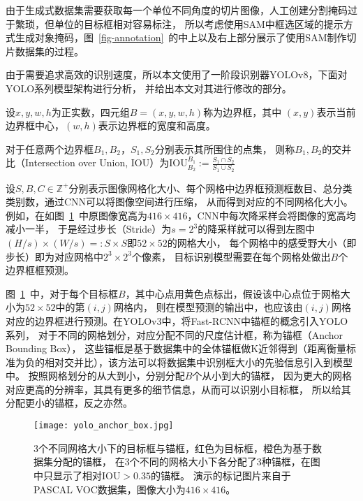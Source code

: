 由于生成式数据集需要获取每一个单位不同角度的切片图像，人工创建分割掩码过于繁琐，但单位的目标框相对容易标注，
所以考虑使用SAM中框选区域的提示方式生成对象掩码，图~\ref{fig-annotation}~的中上以及右上部分展示了使用SAM制作切片数据集的过程。

由于需要追求高效的识别速度，所以本文使用了一阶段识别器YOLOv8，下面对YOLO系列模型架构进行分析，
并给出本文对其进行修改的部分。

设$x,y,w,h$为正实数，四元组$B=(x,y,w,h)$称为边界框，其中
$(x,y)$表示当前边界框中心，$(w,h)$表示边界框的宽度和高度。

对于任意两个边界框$B_1,B_2$，$S_1,S_2$分别表示其所围住的点集，
则称$B_1,B_2$的交并比（Intersection over Union, IOU）为$\text{IOU}_{B_2}^{B_1}:=\frac{S_1\cap S_2}{S_1\cup S_2}$

设$S,B,C\in\mathbb{Z}^+$分别表示图像网格化大小、每个网格中边界框预测框数目、总分类类别数，通过CNN可以将图像空间进行压缩，
从而得到对应的不同网格化大小。例如，在如图~\ref{fig-anchor}~中原图像宽高为$416\times 416$，CNN中每次降采样会将图像的宽高均减小一半，
于是经过步长（Stride）为$s=2^3$的降采样就可以得到左图中$(H/s)\times (W/s) =: S\times S$即$52\times 52$的网格大小，
每个网格中的感受野大小（即步长）即为对应网格中$2^3\times 2^3$个像素，
目标识别模型需要在每个网格处做出$B$个边界框框预测。

图~\ref{fig-anchor}~中，对于每个目标框$B$，其中心点用黄色点标出，假设该中心点位于网格大小为$52\times 52$中的第$(i,j)$网格内，
则在模型预测的输出中，也应该由$(i,j)$网格对应的边界框进行预测。在YOLOv3中，将Fast-RCNN中锚框的概念引入YOLO系列，
对于不同的网格划分，对应分配不同的尺度估计框，称为锚框（Anchor Bounding Box），
这些锚框是基于数据集中的全体锚框做K近邻得到（距离衡量标准为负的相对交并比），该方法可以将数据集中识别框大小的先验信息引入到模型中。
按照网格划分的从大到小，分别分配$B$个从小到大的锚框，
因为更大的网格对应更高的分辨率，其具有更多的细节信息，从而可以识别小目标框，
所以给其分配更小的锚框，反之亦然。

\begin{figure}[htbp]
  \centering
  \texttt{[image: yolo\_anchor\_box.jpg]}
  \caption{3个不同网格大小下的目标框与锚框，红色为目标框，橙色为基于数据集分配的锚框，
  在3个不同的网格大小下各分配了3种锚框，在图中只显示了相对$\text{IOU}>0.35$的锚框。
  演示的标记图片来自于PASCAL VOC数据集，图像大小为$416\times 416$。}
  \label{fig-anchor}
\end{figure}

